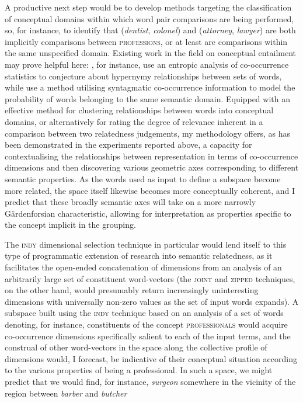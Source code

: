 A productive next step would be to develop methods targeting the classification of conceptual domains within which word pair comparisons are being performed, so, for instance, to identify that (\emph{dentist}, \emph{colonel}) and (\emph{attorney}, \emph{lawyer}) are both implicitly comparisons between \textsc{professions}, or at least are comparisons within the same unspecified domain.  Existing work in the field on conceptual entailment may prove helpful here: \cite{HerbelotEA2013}, for instance, use an entropic analysis of co-occurrence statistics to conjecture about hypernymy relationships between sets of words, while \cite{MelamudEA2014} use a method utilising syntagmatic co-occurrence information to model the probability of words belonging to the same semantic domain.  Equipped with an effective method for clustering relationships between words into conceptual domains, or alternatively for rating the degree of relevance inherent in a comparison between two relatedness judgements, my methodology offers, as has been demonstrated in the experiments reported above, a capacity for contextualising the relationships between representation in terms of co-occurrence dimensions and then discovering various geometric axes corresponding to different semantic properties.  As the words used as input to define a subspace become more related, the space itself likewise becomes more conceptually coherent, and I predict that these broadly semantic axes will take on a more narrowly G\"{a}rdenforsian characteristic, allowing for interpretation as properties specific to the concept implicit in the grouping.

The \textsc{indy} dimensional selection technique in particular would lend itself to this type of programmatic extension of research into semantic relatedness, as it facilitates the open-ended concatenation of dimensions from an analysis of an arbitrarily large set of constituent word-vectors (the \textsc{joint} and \textsc{zipped} techniques, on the other hand, would presumably return increasingly uninteresting dimensions with universally non-zero values as the set of input words expands).  A subspace built using the \textsc{indy} technique based on an analysis of a set of words denoting, for instance, constituents of the concept \textsc{professionals} would acquire co-occurrence dimensions specifically salient to each of the input terms, and the construal of other word-vectors in the space along the collective profile of dimensions would, I forecast, be indicative of their conceptual situation according to the various properties of being a professional.  In such a space, we might predict that we would find, for instance, \emph{surgeon} somewhere in the vicinity of the region between \emph{barber} and \emph{butcher}

